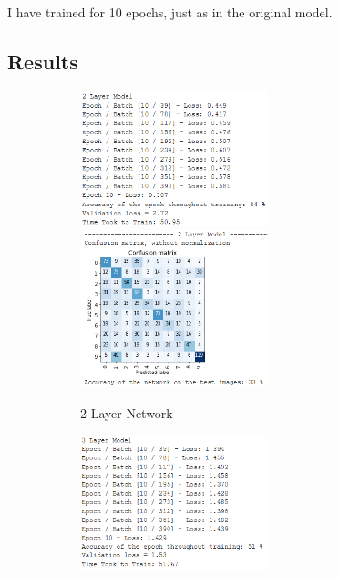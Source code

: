 \documentclass{article}
\begin{document}
    I have trained for 10 epochs, just as in the original model.

    \subsection{Results}
    \begin{figure}[h!]
        \centering
        \begin{subfigure}[t]{0.45\textwidth}
            \centering
            \includegraphics[width=0.6\textwidth]{2Layer_train}
            \includegraphics[width=0.6\textwidth]{2Layer_cm}
            \caption{2 Layer Network}
        \end{subfigure}
        \begin{subfigure}[t]{0.45\textwidth}
            \centering
            \includegraphics[width=0.6\textwidth]{3Layer_train}

\end{subfigure}
\end{figure}
\end{document}
